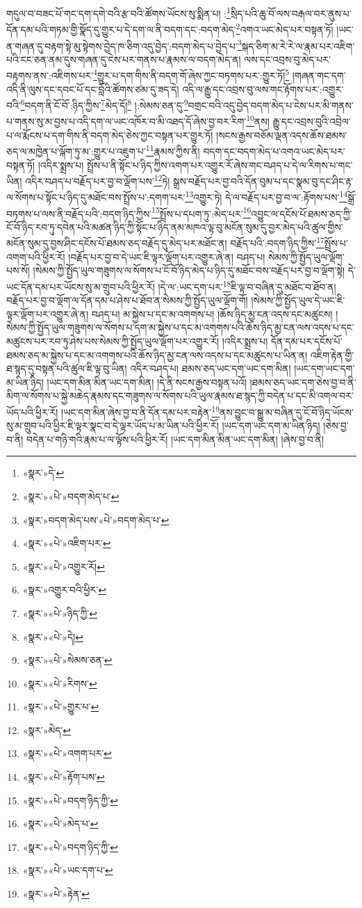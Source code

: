 གདུལ་བ་བཟང་པོ་གང་དག་དགེ་བའི་རྩ་བའི་ཚོགས་ཡོངས་སུ་སྨིན་པ། :\footnote{«སྣར་»དེ་}སྲིད་པའི་ཆུ་བོ་ལས་བརྒལ་བར་ནུས་པ་དོན་དམ་པའི་གཏམ་གྱི་སྣོད་དུ་གྱུར་པ་དེ་དག་ལ་ནི་བདག་དང་:བདག་མེད་\footnote{«སྣར་»«པེ་»བདག་མེད་པ་}འགའ་ཡང་མེད་པར་བསྟན་ཏོ། །ཡང་ན་གཞན་དུ་བརྟག་སྟེ་མུ་སྟེགས་བྱེད་ཁ་ཅིག་འདུ་བྱེད་:བདག་མེད་པ་བྱེད་པ་\footnote{«སྣར་»བདག་མེད་པས་«པེ་»བདག་མེད་པ་}སྐད་ཅིག་མ་རེ་རེ་ལ་རྣམ་པར་འཇིག་པའི་ངང་ཅན་ནམ་དུས་གཞན་དུ་ངེས་པར་གནས་པ་རྣམས་ལ་བདག་མེད་ན། ལས་དང་འབྲས་བུ་མེད་པར་བརྟགས་ནས་:འཇིགས་པར་\footnote{«སྣར་»«པེ་»འཇིག་པར་}གྱུར་པ་དག་གིས་ནི་བདག་གོ་ཞེས་ཀྱང་བཏགས་པར་:གྱུར་ཏོ།\footnote{«སྣར་»«པེ་»འགྱུར་རོ།} །གཞན་གང་དག་འདི་ནི་ལུས་དང་དབང་པོ་དང་བློའི་ཚོགས་ཙམ་དུ་ཟད་དེ། འདི་ལ་རྒྱུ་དང་འབྲས་བུ་ལས་གང་རྟོགས་པར་:འགྱུར་བའི་\footnote{«སྣར་»འགྱུར་བའི་ཕྱིར་}བདག་ནི་ངོ་བོ་:ཉིད་ཀྱིས་\footnote{«སྣར་»«པེ་»ཉིད་ཀྱི་}མེད་དོ།\footnote{«སྣར་»«པེ་»དེ།} །:སེམས་ཅན་དུ་\footnote{«སྣར་»«པེ་»སེམས་ཅན་}བགྲང་བའི་འདུ་བྱེད་བདག་མེད་པ་ངེས་པར་མི་གནས་པ་གནས་སུ་མ་བྱས་པ་འདི་དག་ལ་ཡང་འཁོར་བ་མི་འཐད་དོ་ཞེས་བྱ་བར་རིག་\footnote{«སྣར་»«པེ་»རིགས་}ནས། རྒྱུ་དང་འབྲས་བུའི་འབྲེལ་པ་ལ་རྨོངས་པ་དག་གིས་ནི་བདག་མེད་ཅེས་ཀྱང་བསྟན་པར་གྱུར་ཏོ། །སངས་རྒྱས་བཅོམ་ལྡན་འདས་ཆོས་ཐམས་ཅད་ལ་མཁྱེན་པ་ལྐོག་ཏུ་མ་:གྱུར་པ་འཇུག་པ་\footnote{«སྣར་»«པེ་»གྱུར་པ་}རྣམས་ཀྱིས་ནི། བདག་དང་བདག་མེད་པ་འགའ་ཡང་མེད་པར་བསྟན་ཏོ། །འདིར་སྨྲས་པ། སྤྲོས་པ་ནི་སྟོང་པ་ཉིད་ཀྱིས་འགག་པར་འགྱུར་རོ་ཞེས་གང་བཤད་པ་དེ་ལ་རིགས་པ་གང་ཡིན། འདིར་བཤད་པ་བརྗོད་པར་བྱ་བ་ལྡོག་པས་\footnote{«སྣར་»མེད་}ཏེ། སྒྲས་བརྗོད་པར་བྱ་བའི་དོན་བུམ་པ་དང་སྣམ་བུ་དང་ཤིང་རྟ་ལ་སོགས་པ་སྟོང་པ་ཉིད་དུ་མཐོང་བས་སྤྲོས་པ་:དགག་པར་\footnote{«སྣར་»«པེ་»འགག་པར་}འགྱུར་ཏེ། དེ་ལ་བརྗོད་པར་བྱ་བ་ལ་:རྟོགས་པས་\footnote{«སྣར་»«པེ་»རྟོག་པས་}སྒྲོ་བཏགས་པ་ལས་ནི་བརྗོད་པའི་:བདག་ཉིད་ཀྱིས་\footnote{«སྣར་»«པེ་»བདག་ཉིད་ཀྱི་}སྤྲོས་པ་དཔག་ཏུ་:མེད་པར་\footnote{«སྣར་»«པེ་»མེད་པ་}འབྱུང་ལ་དངོས་པོ་ཐམས་ཅད་ཀྱི་ངོ་བོ་ཉིད་རབ་ཏུ་དབེན་པའི་མཚན་ཉིད་ཀྱི་སྟོང་པ་ཉིད་ནམ་མཁའ་ལྟ་བུ་མངོན་སུམ་དུ་བྱར་མེད་པའི་ཚུལ་གྱིས་མངོན་སུམ་དུ་བྱས་ཤིང་དངོས་པོ་ཐམས་ཅད་བརྗོད་དུ་མེད་པར་མཐོང་ན། བརྗོད་པའི་:བདག་ཉིད་ཀྱིས་\footnote{«སྣར་»«པེ་»བདག་ཉིད་ཀྱི་}སྤྲོས་པ་འགག་པའི་ཕྱིར་རོ། །བརྗོད་པར་བྱ་བ་དེ་ཡང་ཇི་ལྟར་ལྡོག་པར་འགྱུར་ཞེ་ན། བཤད་པ། སེམས་ཀྱི་སྤྱོད་ཡུལ་ལྡོག་པས་སོ། །སེམས་ཀྱི་སྤྱོད་ཡུལ་གཟུགས་ལ་སོགས་པ་ངོ་བོ་ཉིད་མེད་པ་ཉིད་དུ་མཐོང་བས་བརྗོད་པར་བྱ་བ་ལྡོག་སྟེ། དེ་ཡང་དོན་དམ་པར་ཡོངས་སུ་མ་གྲུབ་པའི་ཕྱིར་རོ། །དེ་ལ་:ཡང་དག་པར་\footnote{«སྣར་»«པེ་»ཡང་དག་པ་}ཇི་ལྟ་བ་བཞིན་དུ་མཐོང་བ་ཐོབ་ན། བརྗོད་པར་བྱ་བ་ལྡོག་ལ་དོན་དམ་པ་ཤེས་པ་ཐོབ་ན་སེམས་ཀྱི་སྤྱོད་ཡུལ་ལྡོག་གོ། །སེམས་ཀྱི་སྤྱོད་ཡུལ་དེ་ཡང་ཇི་ལྟར་ལྡོག་པར་འགྱུར་ཞེ་ན། བཤད་པ། མ་སྐྱེས་པ་དང་མ་འགགས་པ། །ཆོས་ཉིད་མྱ་ངན་འདས་དང་མཚུངས། །སེམས་ཀྱི་སྤྱོད་ཡུལ་གཟུགས་ལ་སོགས་པ་དག་མ་སྐྱེས་པ་དང་མ་འགགས་པའི་ཆོས་ཉིད་མྱ་ངན་ལས་འདས་པ་དང་མཚུངས་པར་རབ་ཏུ་ཤེས་པས་སེམས་ཀྱི་སྤྱོད་ཡུལ་ལྡོག་པར་འགྱུར་རོ། །འདིར་སྨྲས་པ། དོན་དམ་པར་དངོས་པོ་ཐམས་ཅད་མ་སྐྱེས་པ་དང་མ་འགགས་པའི་ཆོས་ཉིད་མྱ་ངན་ལས་འདས་པ་དང་མཚུངས་པ་ཡིན་ན། འཇིག་རྟེན་གྱི་ཐ་སྙད་དུ་བསྟན་པའི་ཚུལ་ཇི་ལྟ་བུ་ཡིན། འདིར་བཤད་པ། ཐམས་ཅད་ཡང་དག་ཡང་དག་མིན། །ཡང་དག་ཡང་དག་མ་ཡིན་ཉིད། །ཡང་དག་མིན་མིན་ཡང་དག་མིན། །དེ་ནི་སངས་རྒྱས་བསྟན་པའོ། །ཐམས་ཅད་ཡང་དག་ཅེས་བྱ་བ་ནི་མིག་ལ་སོགས་པ་སྐྱེ་མཆེད་རྣམས་དང་གཟུགས་ལ་སོགས་པའི་ཡུལ་རྣམས་ཐ་སྙད་ཀྱི་བདེན་པ་དང་མི་འགལ་བར་ཡོད་པའི་ཕྱིར་རོ། །ཡང་དག་མིན་ཞེས་བྱ་བ་ནི་དོན་དམ་པར་བརྟེན་\footnote{«སྣར་»«པེ་»རྟེན་}ནས་བྱུང་བ་སྒྱུ་མ་བཞིན་དུ་ངོ་བོ་ཉིད་ཡོངས་སུ་མ་གྲུབ་པའི་ཕྱིར་ཇི་ལྟར་སྣང་བ་དེ་ལྟར་ཡོད་པ་མ་ཡིན་པའི་ཕྱིར་རོ། །ཡང་དག་ཡང་དག་མ་ཡིན་ཉིད། །ཅེས་བྱ་བ་ནི། བདེན་པ་གཉི་གའི་རྣམ་པ་ལ་ལྟོས་པའི་ཕྱིར་རོ། །ཡང་དག་མིན་མིན་ཡང་དག་མིན། །ཞེས་བྱ་བ་ནི། 